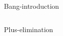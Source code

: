 \documentclass[fleqn]{beamer}
\begin{document}
\begin{frame}{Bang-introduction}
  \begin{mathpar}
  \end{mathpar}
  \pause
  \begin{columns}
    \begin{column}{.33\linewidth}
      \begin{mathpar}
      \end{mathpar}
    \end{column}
    \pause
    \begin{column}{.67\linewidth}
      \begin{mathpar}
      \end{mathpar}
    \end{column}
  \end{columns}
  \pause\vspace{1em}
  \begin{mathpar}
  \end{mathpar}
\end{frame}

\begin{frame}{Plus-elimination}
    \begin{mathpar}
    \end{mathpar}
    \vspace{1em}
    \begin{mathpar}
    \end{mathpar}
\end{frame}
\end{document}
